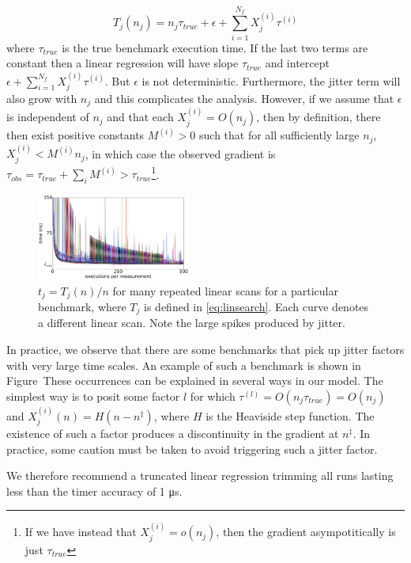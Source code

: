 \documentclass[conference]{IEEEtran}
\begin{document}
\begin{equation}
    \label{eq:linsearch}
    T_j(n_j) = n_j \tau_{true} + \epsilon + \sum_{i=1}^{N_f} X_j^{(i)} \tau^{(i)}
\end{equation}
%
where $\tau_{true}$ is the true benchmark execution time. If the last two terms
are constant then a linear regression will have slope $\tau_{true}$ and intercept $\epsilon + \sum_{i=1}^{N_f} X_j^{(i)} \tau^{(i)}$. But $\epsilon$ is not deterministic. Furthermore, the jitter term will also grow with $n_j$ and this complicates the analysis.
However, if we assume that $\epsilon$ is independent of $n_j$ and that each $X_j^{(i)} = O(n_j)$, then by definition, there then exist positive constants $M^{(i)} > 0$ such that for all sufficiently large $n_j$, $X_j^{(i)} < M^{(i)} n_j$, in which case the observed gradient is $\tau_{obs} = \tau_{true} + \sum_i M^{(i)} > \tau_{true}$\footnote{If we have instead that $X_j^{(i)} = o(n_j)$, then the gradient asympotitically is just $\tau_{true}$}.

\begin{figure}
\centering
\includegraphics[width=0.45\textwidth]{figures/fig2/linear_scan_branchsum}
\caption{$t_j = T_j(n)/n$ for many repeated linear scans for a particular benchmark, where $T_j$ is defined in \eqref{eq:linsearch}. Each curve denotes a different linear scan. Note the large spikes produced by jitter.}
\label{fig:scaling}
\end{figure}

In practice, we observe that there are some benchmarks that pick up jitter factors with very large time scales. An example of such a benchmark is shown in Figure~These occurrences can be explained in several ways in our model. The simplest way is to posit some factor $l$ for which $\tau^{(l)} = O(n_j \tau_{true}) = O(n_j)$ and $X_j^{(i)}(n) = H(n - n^\ddagger)$,
where $H$ is the Heaviside step function. The existence of such a factor produces a discontinuity in the gradient at $n^\ddagger$. In practice, some caution must be taken to avoid triggering such a jitter factor.

We therefore recommend a truncated linear regression trimming all runs lasting less than the timer accuracy of 1 μs.
\end{document}
